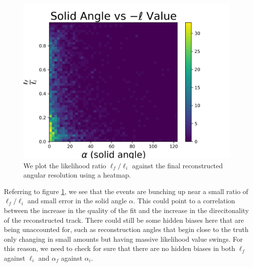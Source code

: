 \begin{figure}[H]
  \centering
  \includegraphics[width=12cm]{./Figures/reco_plots/alpha_dist_vs_llhratio_heat.png}
  \caption{We plot the likelihood ratio $\ell_{f}/\ell_{i}$ against the final reconstructed angular resolution using a heatmap. }
  \label{fig:alpha_llhratio_comp}
\end{figure}

Referring to figure \ref{fig:alpha_llhratio_comp}, we see that the events are bunching up near a small ratio of $\ell_{f}/\ell_{i}$ and small error in the solid angle $\alpha$. This could point to a correlation between the increase in the quality of the fit and the increase in the direcitonality of the reconstructed track. There could still be some hidden biases here that are being unaccounted for, such as reconstruction angles that begin close to the truth only changing in small amounts but having massive likelihood value swings. For this reason, we need to check for sure that there are no hidden biases in both $\ell_{f}$ against $\ell_{i}$ and $\alpha_{f}$ against $\alpha_{i}$.

